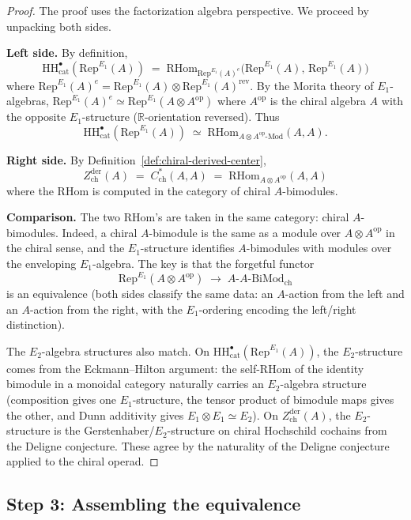 \documentclass[11pt]{article}
\theoremstyle{definition}
\theoremstyle{remark}
\newcommand{\Mod}{\mathrm{Mod}}
\newcommand{\Rep}{\mathrm{Rep}}
\newcommand{\HH}{\mathrm{HH}}
\newcommand{\RHom}{\mathrm{RHom}}
\newcommand{\op}{\mathrm{op}}
\newcommand{\Zder}{Z^{\mathrm{der}}_{\mathrm{ch}}}
\newcommand{\BiMod}{\mathrm{BiMod}}
\begin{document}
\begin{proof}
The proof uses the factorization algebra perspective. We proceed by unpacking both sides.

\smallskip\noindent\textbf{Left side.} By definition,
\[
 \HH^\bullet_{\mathrm{cat}}(\Rep^{E_1}(A)) \;=\; \RHom_{\Rep^{E_1}(A)^e}\bigl(\Rep^{E_1}(A),\, \Rep^{E_1}(A)\bigr)
\]
where $\Rep^{E_1}(A)^e = \Rep^{E_1}(A) \otimes \Rep^{E_1}(A)^{\mathrm{rev}}$. By the Morita theory of $E_1$-algebras, $\Rep^{E_1}(A)^e \simeq \Rep^{E_1}(A \otimes A^{\op})$ where $A^{\op}$ is the chiral algebra $A$ with the opposite $E_1$-structure ($\mathbb{R}$-orientation reversed). Thus
\[
 \HH^\bullet_{\mathrm{cat}}(\Rep^{E_1}(A)) \;\simeq\; \RHom_{A \otimes A^{\op}\text{-}\Mod}(A, A).
\]

\smallskip\noindent\textbf{Right side.} By Definition~\ref{def:chiral-derived-center},
\[
 \Zder(A) \;=\; C^*_{\mathrm{ch}}(A,A) \;=\; \RHom_{A \otimes A^{\op}}(A, A)
\]
where the $\RHom$ is computed in the category of chiral $A$-bimodules.

\smallskip\noindent\textbf{Comparison.} The two $\RHom$'s are taken in the same category: chiral $A$-bimodules. Indeed, a chiral $A$-bimodule is the same as a module over $A \otimes A^{\op}$ in the chiral sense, and the $E_1$-structure identifies $A$-bimodules with modules over the enveloping $E_1$-algebra. The key is that the forgetful functor
\[
 \Rep^{E_1}(A \otimes A^{\op}) \;\longrightarrow\; A\text{-}A\text{-}\BiMod_{\mathrm{ch}}
\]
is an equivalence (both sides classify the same data: an $A$-action from the left and an $A$-action from the right, with the $E_1$-ordering encoding the left/right distinction).

The $E_2$-algebra structures also match. On $\HH^\bullet_{\mathrm{cat}}(\Rep^{E_1}(A))$, the $E_2$-structure comes from the Eckmann--Hilton argument: the self-$\RHom$ of the identity bimodule in a monoidal category naturally carries an $E_2$-algebra structure (composition gives one $E_1$-structure, the tensor product of bimodule maps gives the other, and Dunn additivity gives $E_1 \otimes E_1 \simeq E_2$). On $\Zder(A)$, the $E_2$-structure is the Gerstenhaber/$E_2$-structure on chiral Hochschild cochains from the Deligne conjecture. These agree by the naturality of the Deligne conjecture applied to the chiral operad.
\end{proof}

\subsection{Step 3: Assembling the equivalence}
\end{document}
